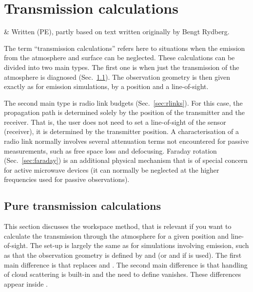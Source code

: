 \chapter{Transmission calculations}
 \label{sec:trans}

 & Written (PE), partly based on text written originally by 
          Bengt Rydberg.
\stophistory

\graphicspath{{Figs/transmission/}}

The term ``transmission calculations'' refers here to situations when the
emission from the atmosphere and surface can be neglected. These
calculations can be divided into two main types. The first one is when just the
transmission of the atmosphere is diagnosed (Sec.~\ref{sec:transmission}). The
observation geometry is then given exactly as for emission simulations, by a
position and a line-of-sight.

The second main type is radio link budgets (Sec.~\ref{sec:rlinks}). For this
case, the propagation path is determined solely by the position of the
transmitter and the receiver. That is, the user does not need to set a
line-of-sight of the sensor (receiver), it is determined by the transmitter
position. A characterisation of a radio link normally involves several
attenuation terms not encountered for passive measurements, such as free space
loss and defocusing. Faraday rotation (Sec.~\ref{sec:faraday}) is an additional
physical mechanism that is of special concern for active microwave devices (it
can normally be neglected at the higher frequencies used for passive
observations).




\section{Pure transmission calculations}
\label{sec:transmission}

This section discusses the  workspace method,
that is relevant if you want to calculate the transmission through the
atmosphere for a given position and line-of-sight. The set-up is largely the
same as for simulations involving emission, such as that the observation
geometry is defined by  and  (or
 and  if  is used).
The first main difference is that  replaces
 and . The second
main difference is that handling of cloud scattering is built-in and the need
to define  vanishes. These differences appear
inside .

